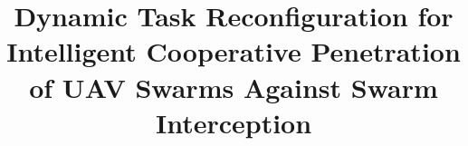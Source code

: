 \documentclass{cja}
\begin{document}
\title{Dynamic Task Reconfiguration for Intelligent Cooperative Penetration of UAV Swarms Against Swarm Interception}






\frontheader{}

\end{document}

